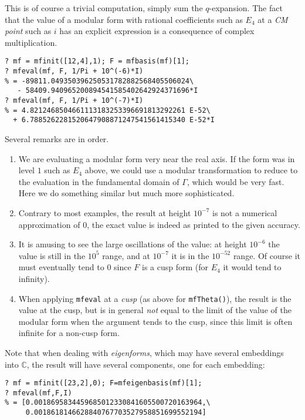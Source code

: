 \documentclass[11pt]{article}
\newcommand{\C}{{\mathbb C}}
\newcommand{\G}{\Gamma}
\def\kbd#1{{\tt #1}}
\begin{document}
This is of course a trivial computation, simply sum the $q$-expansion. The
fact that the value of a modular form with rational coefficients such as
$E_4$ at a \emph{CM point} such as $i$ has an explicit expression is a
consequence of complex multiplication.

\begin{verbatim}
? mf = mfinit([12,4],1); F = mfbasis(mf)[1];
? mfeval(mf, F, 1/Pi + 10^(-6)*I)
% = -89811.049350396250531782882568405506024\
   - 58409.940965200894541585402642924371696*I
? mfeval(mf, F, 1/Pi + 10^(-7)*I)
% = 4.8212468504661113183253396691813292261 E-52\
  + 6.7885262281520647908871247541561415340 E-52*I
\end{verbatim}

Several remarks are in order.

\begin{enumerate}
\item We are evaluating a modular form very near the
  real axis. If the form was in level $1$ such as $E_4$ above, we could use a
  modular transformation to reduce to the evaluation in the fundamental domain
  of $\G$, which would be very fast. Here we do something similar but much
  more sophisticated.
\item Contrary to most examples, the result at height $10^{-7}$ is not a
  numerical approximation of $0$, the exact value is indeed as printed to
  the given accuracy.
\item It is amusing to see the large oscillations of the value: at height
  $10^{-6}$ the value is still in the $10^5$ range, and at $10^{-7}$ it is
  in the $10^{-52}$ range. Of course it must eventually tend to $0$ since
  $F$ is a cusp form (for $E_4$ it would tend to infinity).
\item When applying \kbd{mfeval} at a \emph{cusp} (as above for
  \kbd{mfTheta()}), the result is
  the value at the cusp, but is in general \emph{not} equal
  to the limit of the value of the modular form when the argument tends to
  the cusp, since this limit is often infinite for a non-cusp form.
\end{enumerate}

Note that when dealing with \emph{eigenforms}, which may have several
embeddings into $\C$, the result will have several components, one for each
embedding:

\begin{verbatim}
? mf = mfinit([23,2],0); F=mfeigenbasis(mf)[1];
? mfeval(mf,F,I)
% = [0.0018695834459685012330841605500720163964,\
     0.0018618146628840767703527958851699552194]
\end{verbatim}
\end{document}
